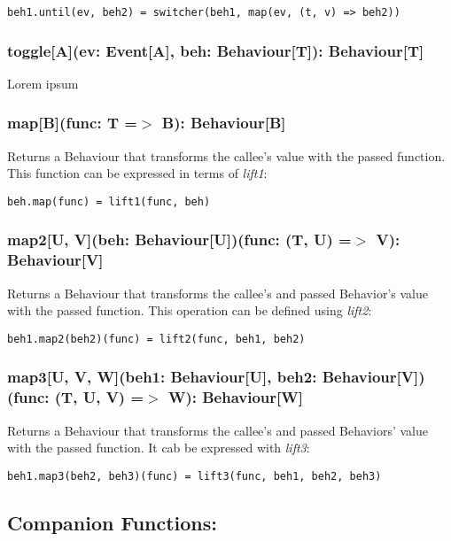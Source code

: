 \begin{verbatim}
beh1.until(ev, beh2) = switcher(beh1, map(ev, (t, v) => beh2))
\end{verbatim}      
      
    \subsubsection*{toggle[A](ev: Event[A], beh: Behaviour[T]): Behaviour[T]}
      Lorem ipsum
      
    \subsubsection*{map[B](func: T =$>$ B): Behaviour[B]}
      Returns a Behaviour that transforms the callee's
      value with the passed function.
      This function can be expressed in terms of \emph{lift1}:

\begin{verbatim}
beh.map(func) = lift1(func, beh)
\end{verbatim}      
      
    \subsubsection*{map2[U, V](beh: Behaviour[U])(func: (T, U) =$>$ V): Behaviour[V]}
      Returns a Behaviour that transforms the callee's
      and passed Behavior's value with the passed function. This operation
      can be defined using \emph{lift2}:

\begin{verbatim}
beh1.map2(beh2)(func) = lift2(func, beh1, beh2)
\end{verbatim}      

    \subsubsection*{map3[U, V, W](beh1: Behaviour[U], beh2: Behaviour[V])(func: (T, U, V) =$>$ W): Behaviour[W]}
      Returns a Behaviour that transforms the callee's
      and passed Behaviors' value with the passed function. It cab
      be expressed with \emph{lift3}:

\begin{verbatim}
beh1.map3(beh2, beh3)(func) = lift3(func, beh1, beh2, beh3)
\end{verbatim}    

    \subsection*{Companion Functions:}
